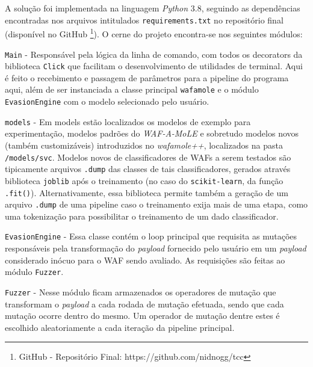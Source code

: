 A solução foi implementada na linguagem \textit{Python} 3.8, seguindo as dependências encontradas nos arquivos intitulados \verb+requirements.txt+ no repositório final (disponível no GitHub \footnote{GitHub - Repositório Final: https://github.com/nidnogg/tcc}). O cerne do projeto encontra-se nos seguintes módulos:
\begin{alineas}
\item \verb+Main+ - Responsável pela lógica da linha de comando, com todos os decorators da biblioteca \verb+Click+ que facilitam o desenvolvimento de utilidades de terminal. Aqui é feito o recebimento e passagem de parâmetros para a pipeline do programa aqui, além de ser instanciada a classe principal \verb+wafamole+ e o módulo \verb+EvasionEngine+ com o modelo selecionado pelo usuário.
\item \verb+models+ - Em models estão localizados os modelos de exemplo para experimentação, modelos padrões do \textit{WAF-A-MoLE} e sobretudo modelos novos (também customizáveis) introduzidos no \textit{wafamole++}, localizados na pasta \verb+/models/svc+. Modelos novos de classificadores de WAFs a serem testados são tipicamente arquivos \verb+.dump+ das classes de tais classificadores, gerados através biblioteca \verb+joblib+ após o treinamento (no caso do \verb+scikit-learn+, da função \verb+.fit()+). Alternativamente, essa biblioteca permite também a geração de um arquivo \verb+.dump+ de uma pipeline caso o treinamento exija mais de uma etapa, como uma tokenização para possibilitar o treinamento de um dado classificador.
\item \verb+EvasionEngine+ - Essa classe contém o loop principal que requisita as mutações responsáveis pela transformação do \textit{payload} fornecido pelo usuário em um \textit{payload} considerado inócuo para o WAF sendo avaliado. As requisições são feitas ao módulo \verb+Fuzzer+.
\item \verb+Fuzzer+ - Nesse módulo ficam armazenados os operadores de mutação que transformam o \textit{payload} a cada rodada de mutação efetuada, sendo que cada mutação ocorre dentro do mesmo. Um operador de mutação dentre estes é escolhido aleatoriamente a cada iteração da pipeline principal.
\end{alineas}

